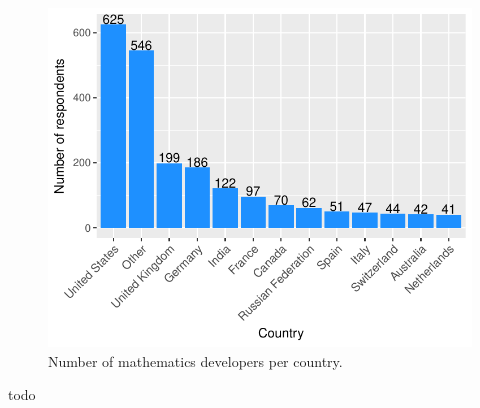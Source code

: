 \documentclass[9pt]{article}
\begin{document}
\begin{figure}[H]
\centering
\includegraphics{report-005}
\caption{Number of mathematics developers per country.}\label{fig_0}
\end{figure}

todo
\end{document}
